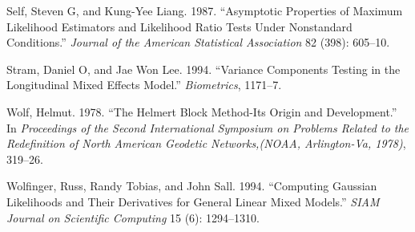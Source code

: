 \documentclass{article}
\begin{document}
\leavevmode\hypertarget{ref-self1987asymptotic}{}%
Self, Steven G, and Kung-Yee Liang. 1987. ``Asymptotic Properties of
Maximum Likelihood Estimators and Likelihood Ratio Tests Under
Nonstandard Conditions.'' \emph{Journal of the American Statistical
Association} 82 (398): 605--10.

\leavevmode\hypertarget{ref-stram1994variance}{}%
Stram, Daniel O, and Jae Won Lee. 1994. ``Variance Components Testing in
the Longitudinal Mixed Effects Model.'' \emph{Biometrics}, 1171--7.

\leavevmode\hypertarget{ref-wolf1978helmert}{}%
Wolf, Helmut. 1978. ``The Helmert Block Method-Its Origin and
Development.'' In \emph{Proceedings of the Second International
Symposium on Problems Related to the Redefinition of North American
Geodetic Networks,(NOAA, Arlington-Va, 1978)}, 319--26.

\leavevmode\hypertarget{ref-wolfinger1994computing}{}%
Wolfinger, Russ, Randy Tobias, and John Sall. 1994. ``Computing Gaussian
Likelihoods and Their Derivatives for General Linear Mixed Models.''
\emph{SIAM Journal on Scientific Computing} 15 (6): 1294--1310.



\end{document}
